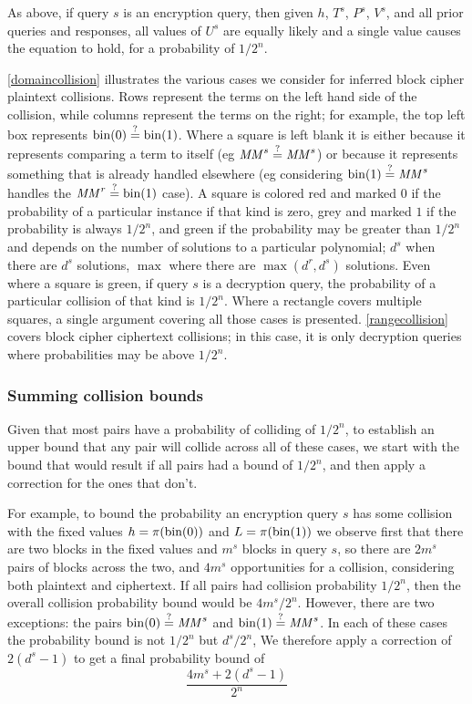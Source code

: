 \documentclass[hctr.tex]{subfiles}
\begin{document}
As above, if query \(s\) is an encryption query,
then given \(h\), \(T^s\), \(P^s\), \(V^s\),
and all prior queries and responses,
all values of \(U^s\) are equally likely
and a single value causes the equation to hold,
for a probability of \(1/2^n\).

\autoref{domaincollision} illustrates the various cases
we consider for inferred block cipher plaintext collisions.
Rows represent the terms
on the left hand side of the collision, while
columns represent the terms on the right; 
for example, the top left box represents
\(\operatorname{bin}(0) \stackrel{\text{?}}{=} \operatorname{bin}(1)\). Where a square is left blank
it is either because it represents
comparing a term to itself (eg \(\mathit{MM}^s \stackrel{\text{?}}{=} \mathit{MM}^s\))
or because it represents something that
is already handled elsewhere
(eg considering \(\operatorname{bin}(1) \stackrel{\text{?}}{=} \mathit{MM}^s\)
handles the \(\mathit{MM}^r \stackrel{\text{?}}{=} \operatorname{bin}(1)\) case).
A square is colored red
and marked \(0\) if the
probability of a particular instance
if that kind is zero, grey
and marked \(1\) if
the probability is always \(1/2^n\),
and green if the probability may be
greater than \(1/2^n\) and depends
on the number of solutions to a
particular polynomial;
\(d^s\) when there are \(d^s\) solutions,
\(\max\) where there are
\(\max(d^r, d^s)\) solutions.
Even where a square is green,
if query \(s\) is a decryption query,
the probability of a particular collision of
that kind is \(1/2^n\).
Where a rectangle covers
multiple squares, a single argument
covering all those cases is presented.
\autoref{rangecollision} covers
block cipher ciphertext collisions; in this case,
it is only decryption queries where
probabilities may be above \(1/2^n\).

\subsubsection{Summing collision bounds}
Given that most pairs have a probability of
colliding of \(1/2^n\), 
to establish an upper bound that any pair
will collide across all of these cases,
we start with the bound that would result
if all pairs had a bound of \(1/2^n\),
and then apply a correction for the ones that don't.

For example,
to bound the probability an encryption query \(s\)
has some collision with the fixed values
\(h = \pi(\operatorname{bin}(0))\) and \(L = \pi(\operatorname{bin}(1))\)
we observe first that
there are two blocks in the fixed values
and \(m^s\) blocks in query \(s\), so there are
\(2m^s\) pairs of blocks across the two,
and \(4m^s\) opportunities for a collision, 
considering both plaintext and ciphertext.
If all pairs had collision probability \(1/2^n\),
then the overall collision probability bound
would be \(4m^s/2^n\). However, there are
two exceptions: the pairs
\(\operatorname{bin}(0) \stackrel{\text{?}}{=} \mathit{MM}^s\) and
\(\operatorname{bin}(1) \stackrel{\text{?}}{=} \mathit{MM}^s\). In each of these
cases the probability bound is not \(1/2^n\) but
\(d^s/2^n\), We therefore apply a correction
of \(2(d^s - 1)\) to get a final probability bound of
\begin{displaymath}
    \frac{4m^s + 2(d^s - 1)}{2^n}
\end{displaymath}
\end{document}
